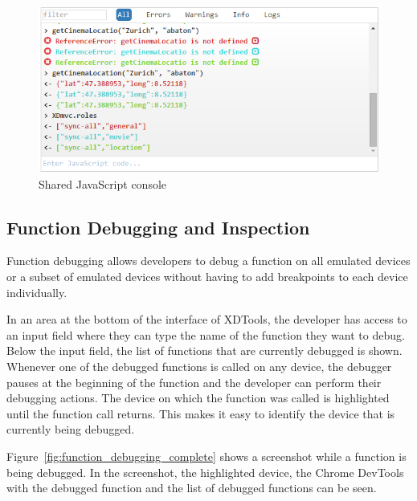 \begin{figure}[H]
  \centering
    \includegraphics[width=1.0\textwidth]{images/screenshots/js_console_3.png}
	\caption[Screenshot: JavaScript console]{Shared JavaScript console}
	\label{fig:js_console}
\end{figure}

\subsection{Function Debugging and Inspection}

Function debugging allows developers to debug a function on all emulated devices or a subset of emulated devices without having to add breakpoints to each device individually.

In an area at the bottom of the interface of XDTools, the developer has access to an input field where they can type the name of the function they want to debug.  Below the input field, the list of functions that are currently debugged is shown. Whenever one of the debugged functions is called on any device, the debugger pauses at the beginning of the function and the developer can perform their debugging actions. The device on which the function was called is highlighted until the function call returns. This makes it easy to identify the device that is currently being debugged.

Figure~\ref{fig:function_debugging_complete} shows a screenshot while a function is being debugged. In the screenshot, the highlighted device, the Chrome DevTools with the debugged function and the list of debugged functions can be seen.


